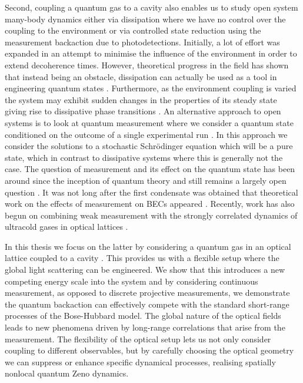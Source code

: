 Second, coupling a quantum gas to a cavity also enables us to study
open system many-body dynamics either via dissipation where we have no
control over the coupling to the environment or via controlled state
reduction using the measurement backaction due to
photodetections. Initially, a lot of effort was expanded in an attempt
to minimise the influence of the environment in order to extend
decoherence times. However, theoretical progress in the field has
shown that instead being an obstacle, dissipation can actually be used
as a tool in engineering quantum states \cite{diehl2008}. Furthermore,
as the environment coupling is varied the system may exhibit sudden
changes in the properties of its steady state giving rise to
dissipative phase transitions \cite{carmichael1980, werner2005,
  capriotti2005, morrison2008, eisert2010, bhaseen2012, diehl2010,
  vznidarivc2011}. An alternative approach to open systems is to look
at quantum measurement where we consider a quantum state conditioned
on the outcome of a single experimental run \cite{carmichael,
  MeasurementControl}. In this approach we consider the solutions to a
stochastic Schr\"{o}dinger equation which will be a pure state, which
in contrast to dissipative systems where this is generally not the
case. The question of measurement and its effect on the quantum state
has been around since the inception of quantum theory and still
remains a largely open question \cite{zurek2002}. It was not long
after the first condensate was obtained that theoretical work on the
effects of measurement on BECs appeared \cite{cirac1996, castin1997,
  ruostekoski1997}. Recently, work has also begun on combining weak
measurement with the strongly correlated dynamics of ultracold gases
in optical lattices \cite{mekhov2012, mekhov2009prl, mekhov2009pra,
  LP2010, douglas2012, LP2011, douglas2013, ashida2015, ashida2015a}.

In this thesis we focus on the latter by considering a quantum gas in
an optical lattice coupled to a cavity \cite{mekhov2012}. This
provides us with a flexible setup where the global light scattering
can be engineered. We show that this introduces a new competing energy
scale into the system and by considering continuous measurement, as
opposed to discrete projective measurements, we demonstrate the
quantum backaction can effectively compete with the standard
short-range processes of the Bose-Hubbard model. The global nature of
the optical fields leads to new phenomena driven by long-range
correlations that arise from the measurement. The flexibility of the
optical setup lets us not only consider coupling to different
observables, but by carefully choosing the optical geometry we can
suppress or enhance specific dynamical processes, realising spatially
nonlocal quantum Zeno dynamics.

